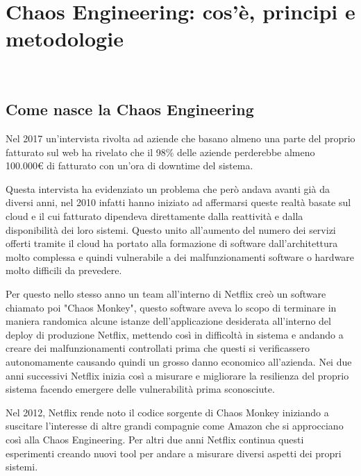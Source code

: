 
\chapter{Chaos Engineering: cos'è, principi e metodologie}
\label{cap:processi-metodologie}

\\

\section{Come nasce la Chaos Engineering}

Nel 2017 un'intervista rivolta ad aziende che basano almeno una parte del proprio fatturato sul web ha rivelato che il 98\% delle aziende perderebbe almeno 100.000€ di fatturato con un'ora di downtime del sistema.

Questa intervista ha evidenziato un problema che però andava avanti già da diversi anni, nel 2010 infatti hanno iniziato ad affermarsi queste realtà basate sul cloud e il cui fatturato dipendeva direttamente dalla reattività e dalla disponibilità dei loro sistemi.
Questo unito all'aumento del numero dei servizi offerti tramite il cloud ha portato alla formazione di software dall'architettura molto complessa e quindi vulnerabile a dei malfunzionamenti software o hardware molto difficili da prevedere.

Per questo nello stesso anno un team all'interno di Netflix creò un software chiamato poi "Chaos Monkey", questo software aveva lo scopo di terminare in maniera randomica alcune istanze dell'applicazione desiderata all'interno del deploy di produzione Netflix, mettendo così in difficoltà in sistema e andando a creare dei malfunzionamenti controllati prima che questi si verificassero autonomamente causando quindi un grosso danno economico all'azienda.
Nei due anni successivi Netflix inizia così a misurare e migliorare la resilienza del proprio sistema facendo emergere delle vulnerabilità prima sconosciute.

Nel 2012, Netflix rende noto il codice sorgente di Chaos Monkey iniziando a suscitare l'interesse di altre grandi compagnie come Amazon che si approcciano così alla Chaos Engineering.
Per altri due anni Netflix continua questi esperimenti creando nuovi tool per andare a misurare diversi aspetti dei propri sistemi.

